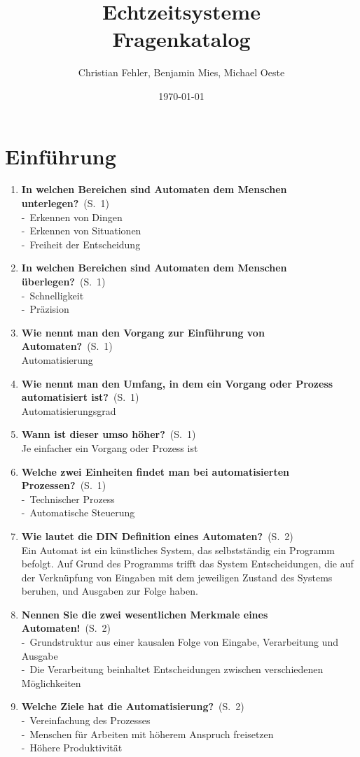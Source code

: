 \documentclass[a4paper,12pt]{article}
\title{{\Huge Echtzeitsysteme}\\Fragenkatalog}
\author{{\Large Christian Fehler, Benjamin Mies, Michael Oeste}}
\date{\small\today}
\newcommand{\question}[3]{\pagebreak[3]\item {\textbf{#1?}}\ (S.\ #2)#3}
\newcommand{\statement}[3]{\pagebreak[3]\item {\textbf{#1!}}\ (S.\ #2)#3}
\newcommand{\catchword}[1]{\\-\ #1}
\newcommand{\normaltext}[1]{\\#1}
\newcommand{\page}[1]{#1}
\begin{document}
\maketitle
\newpage
\tableofcontents

\newpage
\section{Einführung}

\begin{enumerate}

  \question{In welchen Bereichen sind Automaten dem Menschen unterlegen}{\page{1}}
  {
    \catchword{Erkennen von Dingen}
    \catchword{Erkennen von Situationen}
    \catchword{Freiheit der Entscheidung}
  }

  \question{In welchen Bereichen sind Automaten dem Menschen überlegen}{\page{1}}
  {
    \catchword{Schnelligkeit}
    \catchword{Präzision}
  }

  \question{Wie nennt man den Vorgang zur Einführung von Automaten}{\page{1}}
  {
   \normaltext{Automatisierung}
  }

  \question{Wie nennt man den Umfang, in dem ein Vorgang oder Prozess automatisiert ist}{\page{1}}
  {
    \normaltext{Automatisierungsgrad}
  }

  \question{Wann ist dieser umso höher}{\page{1}}
  {
    \normaltext{Je einfacher ein Vorgang oder Prozess ist}
  }

  \question{Welche zwei Einheiten findet man bei automatisierten Prozessen}{\page{1}}
  {
    \catchword{Technischer Prozess}
    \catchword{Automatische Steuerung}
  }

  \question{Wie lautet die DIN Definition eines Automaten}{\page{2}}
  {
    \normaltext{Ein Automat ist ein künstliches System, das selbstständig ein Programm
                befolgt. Auf Grund des Programms trifft das System Entscheidungen, die
                auf der Verknüpfung von Eingaben mit dem jeweiligen Zustand des Systems
                beruhen, und Ausgaben zur Folge haben.}
  }

  \statement{Nennen Sie die zwei wesentlichen Merkmale eines Automaten}{\page{2}}
  {
    \catchword{Grundstruktur aus einer kausalen Folge von Eingabe, Verarbeitung und Ausgabe}
    \catchword{Die Verarbeitung beinhaltet Entscheidungen zwischen verschiedenen Möglichkeiten}
  }

  \question{Welche Ziele hat die Automatisierung}{\page{2}}
  {
    \catchword{Vereinfachung des Prozesses}
    \catchword{Menschen für Arbeiten mit höherem Anspruch freisetzen}
    \catchword{Höhere Produktivität}
  }


\end{enumerate}
\end{document}
